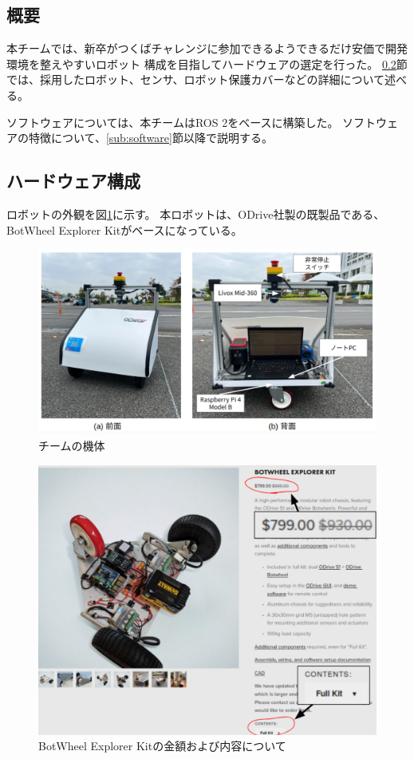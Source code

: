 \documentclass[twocolumn,9pt]{jsproceedings}
\begin{document}
\subsection{概要}
本チームでは、新卒がつくばチャレンジに参加できるようできるだけ安価で開発環境を整えやすいロボット
構成を目指してハードウェアの選定を行った。
\ref{sub:hardware}節では、採用したロボット、センサ、ロボット保護カバーなどの詳細について述べる。

ソフトウェアについては、本チームはROS 2\cite{ROS 2}をベースに構築した。
ソフトウェアの特徴について、\ref{sub:software}節以降で説明する。


\subsection{ハードウェア構成}\label{sub:hardware}
ロボットの外観を図\ref{fig:robot}に示す。
本ロボットは、ODrive社製の既製品である、BotWheel Explorer Kit\cite{RTshop}がベースになっている。

\begin{figure}[h]
  \begin{center}
    \includegraphics[width=1.0\linewidth]{figs/0_robot.pdf}
    \caption{チームの機体}
    \label{fig:robot}
  \end{center}
\end{figure}

\begin{figure}[h]
  \begin{center}
    \includegraphics[width=0.8\linewidth]{figs/b_kit_price.pdf}
    \caption{BotWheel Explorer Kitの金額および内容について}
    \label{fig:b_robot_price}
  \end{center}
\end{figure}
\end{document}
